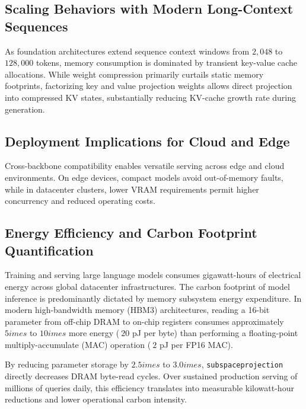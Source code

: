 \subsection{Scaling Behaviors with Modern Long-Context Sequences}
As foundation architectures extend sequence context windows from $2{,}048$ to $128{,}000$ tokens, memory consumption is dominated by transient key-value cache allocations. While weight compression primarily curtails static memory footprints, factorizing key and value projection weights allows direct projection into compressed KV states, substantially reducing KV-cache growth rate during generation.

\subsection{Deployment Implications for Cloud and Edge}
Cross-backbone compatibility enables versatile serving across edge and cloud environments. On edge devices, compact models avoid out-of-memory faults, while in datacenter clusters, lower VRAM requirements permit higher concurrency and reduced operating costs.

\subsection{Energy Efficiency and Carbon Footprint Quantification}
Training and serving large language models consumes gigawatt-hours of electrical energy across global datacenter infrastructures. The carbon footprint of model inference is predominantly dictated by memory subsystem energy expenditure. In modern high-bandwidth memory (HBM3) architectures, reading a 16-bit parameter from off-chip DRAM to on-chip registers consumes approximately $5	imes$ to $10	imes$ more energy ($~20$ pJ per byte) than performing a floating-point multiply-accumulate (MAC) operation ($~2$ pJ per FP16 MAC).

By reducing parameter storage by $2.5	imes$ to $3.0	imes$, \texttt{subspaceprojection} directly decreases DRAM byte-read cycles. Over sustained production serving of millions of queries daily, this efficiency translates into measurable kilowatt-hour reductions and lower operational carbon intensity.
